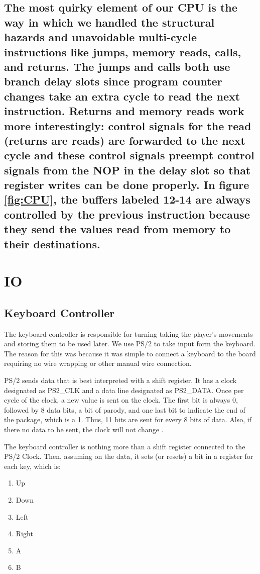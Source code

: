 \documentclass[onecolumn]{IEEEtran}
\begin{document}
\subsection{The most quirky element of our CPU is the way in which we handled the structural hazards and unavoidable multi-cycle instructions like jumps, memory reads, calls, and returns.  The jumps and calls both use branch delay slots since program counter changes take an extra cycle to read the next instruction.  Returns and memory reads work more interestingly: control signals for the read (returns are reads) are forwarded to the next cycle and these control signals preempt control signals from the NOP in the delay slot so that register writes can be done properly. In figure \ref{fig:CPU}, the buffers labeled 12-14 are always controlled by the previous instruction because they send the values read from memory to their destinations.  }

\section{IO}
\subsection{Keyboard Controller}
The keyboard controller is responsible for turning taking the player's movements and storing them to be used later.  We use PS/2 to take input form the keyboard.  The reason for this was because it was simple to connect a keyboard to the board requiring no wire wrapping or other manual wire connection.

PS/2 sends data that is best interpreted with a shift register.  It has a clock designated as PS2\_CLK and a data line designated as PS2\_DATA.  Once per cycle of the clock, a new value is sent on the clock.  The first bit is always 0, followed by 8 data bits, a bit of parody, and one last bit to indicate the end of the package, which is a 1.  Thus, 11 bits are sent for every 8 bits of data.  Also, if there no data to be sent, the clock will not change \cite{ps2}.

The keyboard controller is nothing more than a shift register connected to the PS/2 Clock.  Then, assuming on the data, it sets (or resets) a bit in a register for each key, which is:

\begin{enumerate}
	\item Up
	\item Down
	\item Left
	\item Right
	\item A
	\item B
\end{enumerate}
\end{document}
